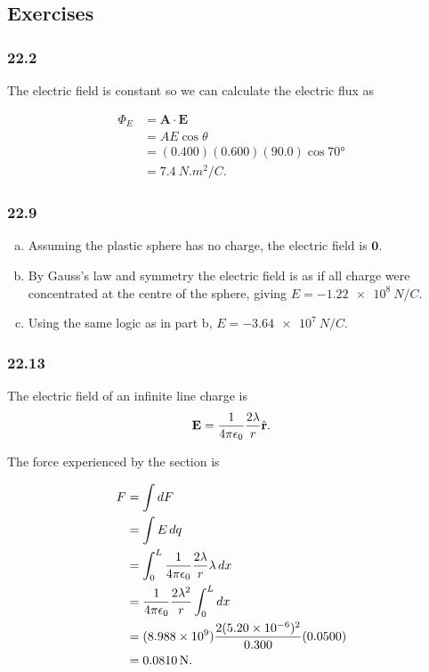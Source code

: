 \documentclass{article}
\begin{document}
\subsection{Exercises}

\subsubsection{22.2}

The electric field is constant so we can calculate the electric flux as

\begin{align*}
  \Phi_E & = \mathbf{A} \cdot \mathbf {E}       \\
         & = A E \cos \theta                    \\
         & = (0.400)(0.600)(90.0) \cos \ang{70} \\
         & = \qty{7.4}{N.m^2/C}.
\end{align*}

\subsubsection{22.9}

\begin{enumerate}[a)]
  \item Assuming the plastic sphere has no charge, the electric field is $\mathbf{0}$.

  \item By Gauss's law and symmetry the electric field is as if all charge were concentrated at the centre of the sphere, giving $E = \qty{-1.22e8}{N/C}$.

  \item Using the same logic as in part b, $E = \qty{-3.64e7}{N/C}$.
\end{enumerate}

\subsubsection{22.13}

The electric field of an infinite line charge is \[\mathbf{E} = \frac{1}{4 \pi \epsilon_0} \frac{2 \lambda}{r} \hat{\mathbf{r}}.\]

The force experienced by the section is

\begin{align*}
  F & = \int dF                                                   \\
    & = \int E \, dq                                              \\
    & = \int_0^L \frac{1}{4 \pi \epsilon_0} \frac{2 \lambda}{r} \lambda \, dx            \\
    & = \frac{1}{4 \pi \epsilon_0} \frac{2 \lambda^2}{r} \int_0^L dx                     \\
    & = (\num{8.988e9}) \frac{2 (\num{5.20e-6})^2}{0.300}(0.0500) \\
    & = \qty{0.0810}{N}.
\end{align*}
\end{document}
